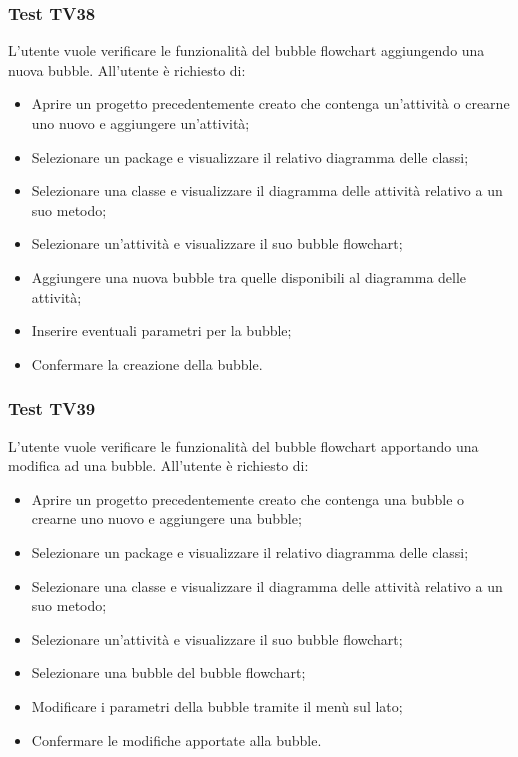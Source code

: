 \documentclass[../PianoDiQualifica.tex]{subfiles}
\begin{document}
	
	
	
	\subsubsection{Test TV38} 
	L'utente vuole verificare le funzionalità del bubble flowchart aggiungendo una nuova bubble. 
	All'utente è richiesto di: 
	\begin{itemize} 
		\item Aprire un progetto precedentemente creato che contenga un'attività o crearne uno nuovo e aggiungere un'attività;
		\item Selezionare un package e visualizzare il relativo diagramma delle classi; 
		\item Selezionare una classe e visualizzare il diagramma delle attività relativo a un suo metodo; %
		\item Selezionare un'attività e visualizzare il suo bubble flowchart; 
		\item Aggiungere una nuova bubble tra quelle disponibili al diagramma delle attività; 
		\item Inserire eventuali parametri per la bubble; 
		\item Confermare la creazione della bubble. 
	\end{itemize} 
	
	\subsubsection{Test TV39} 
	L'utente vuole verificare le funzionalità del bubble flowchart apportando una modifica ad una bubble. 
	All'utente è richiesto di: 
	\begin{itemize} 
		\item Aprire un progetto precedentemente creato che contenga una bubble o crearne uno nuovo e aggiungere una bubble;
		\item Selezionare un package e visualizzare il relativo diagramma delle classi; 
		\item Selezionare una classe e visualizzare il diagramma delle attività relativo a un suo metodo; 
		\item Selezionare un'attività e visualizzare il suo bubble flowchart; 
		\item Selezionare una bubble del bubble flowchart; 
		\item Modificare i parametri della bubble tramite il menù sul lato;%
		\item Confermare le modifiche apportate alla bubble. 
	\end{itemize} 
	
\end{document}
